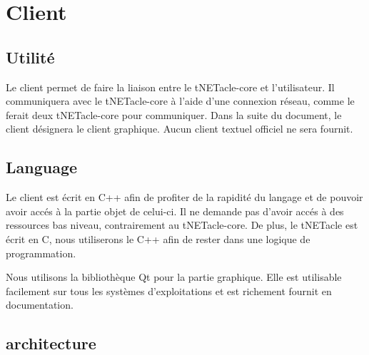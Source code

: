 \section{Client}
\subsection{Utilité}
Le client permet de faire la liaison entre le tNETacle-core et l'utilisateur.
Il communiquera avec le tNETacle-core à l'aide d'une connexion réseau,
comme le ferait deux tNETacle-core pour communiquer.
Dans la suite du document, le client désignera le client graphique.
Aucun client textuel officiel ne sera fournit.

\subsection{Language}
Le client est écrit en C++ afin de profiter de la rapidité du langage et de pouvoir avoir accés à la partie objet de celui-ci.
Il ne demande pas d'avoir accés à des ressources bas niveau, contrairement au tNETacle-core.
De plus, le tNETacle est écrit en C, nous utiliserons le C++ afin de rester dans une logique de programmation.

Nous utilisons la bibliothèque Qt pour la partie graphique.
Elle est utilisable facilement sur tous les systèmes d'exploitations et est richement fournit en documentation.

\subsection{architecture}
